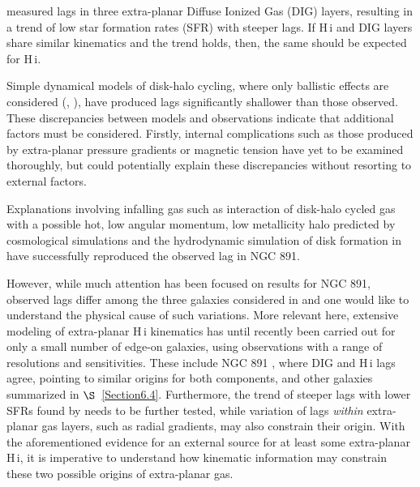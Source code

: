 \documentclass{emulateapj}
\begin{document}
\par
     \citet{2007ApJ...663..933H} measured lags in three extra-planar Diffuse Ionized Gas (DIG) layers, resulting in a trend of low star formation rates (SFR) with steeper lags.  If {\sc H\,i} and DIG layers share similar kinematics and the \citet{2007ApJ...663..933H} trend holds, then, the same should be expected for {\sc H\,i}.

\par
  Simple dynamical models of disk-halo cycling, where only ballistic effects are considered (\citealt{2002ApJ...578...98C}, \citealt{2006MNRAS.366..449F}), have produced lags significantly shallower than those observed. These discrepancies between models and observations indicate that additional factors must be considered. Firstly, internal complications such as those produced by extra-planar pressure gradients or magnetic tension \citep{2002ASPC..276..201B} have yet to be examined thoroughly, but could potentially explain these discrepancies without resorting to external factors. 

\par
     Explanations involving infalling gas such as interaction of disk-halo cycled gas with a possible hot, low angular momentum, low metallicity halo predicted by cosmological simulations \citep{2011MNRAS.415.1534M} and the hydrodynamic simulation of disk formation in \citet{2006MNRAS.370.1612K} have successfully reproduced the observed lag in NGC 891.  

\par
    However, while much attention has been focused on results for NGC 891, observed lags differ among the three galaxies considered in \citet{2007ApJ...663..933H} and one would like to understand the physical cause of such variations.  More relevant here, extensive modeling of extra-planar {\sc H\,i} kinematics has until recently been carried out for only a small number of edge-on galaxies, using observations with a range of resolutions and sensitivities.  These include NGC 891 \citep{2007AJ....134.1019O}, where DIG and {\sc H\,i} lags agree, pointing to similar origins for both components, and other galaxies summarized in $\S$~\ref{Section6.4}.  Furthermore, the trend of steeper lags with lower SFRs found by \citet{2007ApJ...663..933H} needs to be further tested, while variation of lags \textit{within} extra-planar gas layers, such as radial gradients, may also constrain their origin.  With the aforementioned evidence for an external source for at least some extra-planar {\sc H\,i}, it is imperative to understand how kinematic information may constrain these two possible origins of extra-planar gas.  
\end{document}
